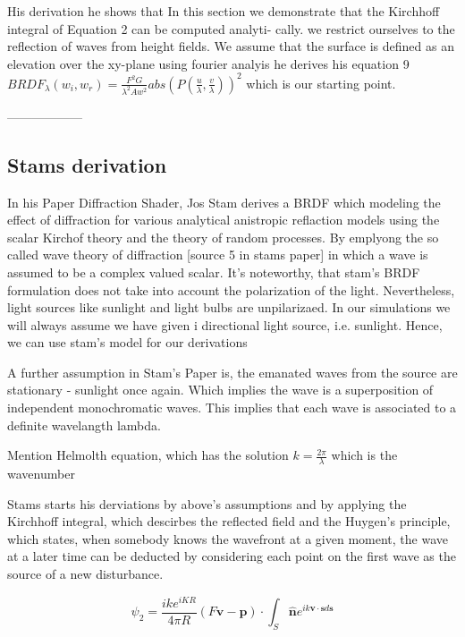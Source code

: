 His derivation he shows that 
In this section we demonstrate that the Kirchhoff integral of Equation 2 can be computed analyti- cally.
we restrict ourselves to the reflection of waves from height fields. We assume that the surface is defined as an elevation over the xy-plane using fourier analyis he derives his equation 9 
$BRDF_{\lambda}(w_i, w_r) = \frac{F^2 G}{\lambda^2 A w^2}abs(P(\frac{u}{\lambda},\frac{v}{\lambda}))^2$ 
which is our starting point.

------------------

\subsection{Stams derivation}

In his Paper Diffraction Shader, Jos Stam derives a BRDF which modeling the effect of diffraction for various analytical anistropic reflaction models using the scalar Kirchof theory and the theory of random processes. By emplyong the so called wave theory of diffraction [source 5 in stams paper] in which a wave is assumed to be a complex valued scalar. It's noteworthy, that stam's BRDF formulation does not take into account the polarization of the light. Nevertheless, light sources like sunlight and light bulbs are unpilarizaed. In our simulations we will always assume we have given i directional light source, i.e. sunlight. Hence, we can use stam's model for our derivations

A further assumption in Stam's Paper is, the emanated waves from the source are stationary - sunlight once again.
Which implies the wave is a superposition of independent monochromatic waves. This implies that each wave is associated to a definite wavelangth lambda.

Mention Helmolth equation, which has the solution $k = \frac{2\pi}{\lambda}$ which is the wavenumber

Stams starts his derviations by above's assumptions and by applying the Kirchhoff integral, which descirbes the reflected field and the Huygen's principle, which states, when somebody knows the wavefront at a given moment, the wave at a later time can be deducted by considering each point on the first wave as the source of a new disturbance.

\begin{equation}
  \psi_2 = \frac{i k e^{i K R}}{4 \pi R}(F\mathbf{v}-\mathbf{p}) \cdot \int_{S} \hat{\mathbf{n}} e^{ik\mathbf{v} \cdot \mathbf{s} d\mathbf{s}}
\end{equation}



